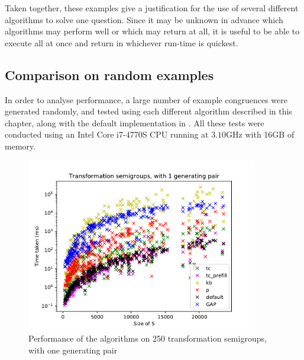 
Taken together, these examples give a justification for the use of several
different algorithms to solve one question.  Since it may be unknown in advance
which algorithms may perform well or which may return at all, it is useful to be
able to execute all at once and return in whichever run-time is quickest.

\subsection{Comparison on random examples}
\label{sec:random-benchmarking}
In order to analyse performance, a large number of example congruences were
generated randomly, and tested using each different algorithm described in this
chapter, along with the default implementation in \GAP{} \cite{gap}.  All these
tests were conducted using an Intel Core i7-4770S CPU running at $3.10$GHz with
16GB of memory.

\begin{figure}[p]
  \centering
  \includegraphics[width=0.9\textwidth]{pics/ch-pairs/bench-trans-1p-times}
  \caption[Benchmark: all algorithms, concrete, 1 pair]
  {Performance of the algorithms on 250 transformation semigroups, with
    one generating pair}
  \label{fig:bench-trans-1p-times}
\end{figure}

